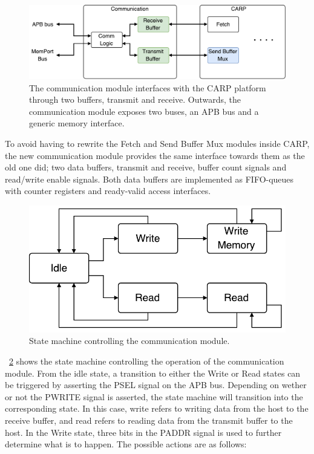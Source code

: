 \begin{figure}[ht]
  \centering
  \includegraphics[width=0.8\linewidth]{fig/comm-io}
  \caption[Communication module]{
    The communication module interfaces with the CARP platform through two
    buffers, transmit and receive. Outwards, the communication module exposes two
    buses, an APB bus and a generic memory interface.
  }
  \label{fig:comm-io}
\end{figure}

To avoid having to rewrite the Fetch and Send Buffer Mux modules inside CARP,
the new communication module provides the same interface towards them as the old
one did; two data buffers, transmit and receive, buffer count signals and
read/write enable signals. Both data buffers are implemented as FIFO-queues with
counter registers and ready-valid access interfaces.

\begin{figure}[ht]
  \centering
  \includegraphics[width=0.5\linewidth]{fig/comm-fsm}
  \caption[Communication module state machine]{State machine controlling the communication module.}
  \label{fig:comm-fsm}
\end{figure}

\figurename~\ref{fig:comm-fsm} shows the state machine controlling the operation
of the communication module. From the idle state, a transition to either the
Write or Read states can be triggered by asserting the PSEL signal on the APB
bus. Depending on wether or not the PWRITE signal is asserted, the state machine
will transition into the corresponding state. In this case, write refers to
writing data from the host to the receive buffer, and read refers to reading
data from the transmit buffer to the host. In the Write state, three bits in the
PADDR signal is used to further determine what is to happen. The possible
actions are as follows:

